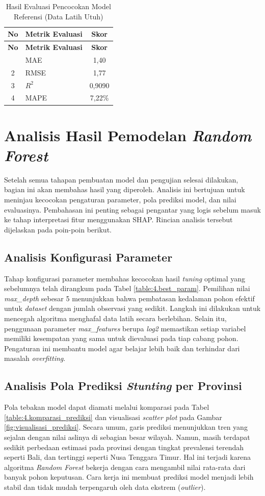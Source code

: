 \begin{longtable}{|c|p{}|c|}
    \caption{Hasil Evaluasi Pencocokan Model Referensi (Data Latih Utuh)}
    \label{table:4.hasil_evaluasi}\\
    \hline
    \textbf{No} & \multicolumn{1}{c|}{\textbf{Metrik Evaluasi}} & \textbf{Skor} \tabularnewline 
    \hline
    \endfirsthead
    \hline
    \textbf{No} & \multicolumn{1}{c|}{\textbf{Metrik Evaluasi}} & \textbf{Skor} \tabularnewline 
    \hline
    \endhead
    \hline
    \endfoot
    \hline
    \endlastfoot
    1 & MAE & 1,40 \tabularnewline 
    \hline
    2 & RMSE & 1,77 \tabularnewline
    \hline
    3 & $R^2$ & 0,9090 \tabularnewline
    \hline
    4 & MAPE & 7,22\% \tabularnewline
    \hline
\end{longtable}

\section{Analisis Hasil Pemodelan \textit{Random Forest}}
Setelah semua tahapan pembuatan model dan pengujian selesai dilakukan, bagian ini akan membahas hasil yang diperoleh. Analisis ini bertujuan untuk meninjau kecocokan pengaturan parameter, pola prediksi model, dan nilai evaluasinya. Pembahasan ini penting sebagai pengantar yang logis sebelum masuk ke tahap interpretasi fitur menggunakan SHAP. Rincian analisis tersebut dijelaskan pada poin-poin berikut.

\subsection{Analisis Konfigurasi Parameter}
Tahap konfigurasi parameter membahas kecocokan hasil \textit{tuning} optimal yang sebelumnya telah dirangkum pada Tabel \ref{table:4.best_param}. Pemilihan nilai \textit{max\_depth} sebesar 5 menunjukkan bahwa pembatasan kedalaman pohon efektif untuk \textit{dataset} dengan jumlah observasi yang sedikit. Langkah ini dilakukan untuk mencegah algoritma menghafal data latih secara berlebihan. Selain itu, penggunaan parameter \textit{max\_features} berupa \textit{log2} memastikan setiap variabel memiliki kesempatan yang sama untuk dievaluasi pada tiap cabang pohon. Pengaturan ini membantu model agar belajar lebih baik dan terhindar dari masalah \textit{overfitting}.

\subsection{Analisis Pola Prediksi \textit{Stunting} per Provinsi}
Pola tebakan model dapat diamati melalui komparasi pada Tabel \ref{table:4.komparasi_prediksi} dan visualisasi \textit{scatter plot} pada Gambar \ref{fig:visualisasi_prediksi}. Secara umum, garis prediksi menunjukkan tren yang sejalan dengan nilai aslinya di sebagian besar wilayah. Namun, masih terdapat sedikit perbedaan estimasi pada provinsi dengan tingkat prevalensi terendah seperti Bali, dan tertinggi seperti Nusa Tenggara Timur. Hal ini terjadi karena algoritma \textit{Random Forest} bekerja dengan cara mengambil nilai rata-rata dari banyak pohon keputusan. Cara kerja ini membuat prediksi model menjadi lebih stabil dan tidak mudah terpengaruh oleh data ekstrem (\textit{outlier}).

